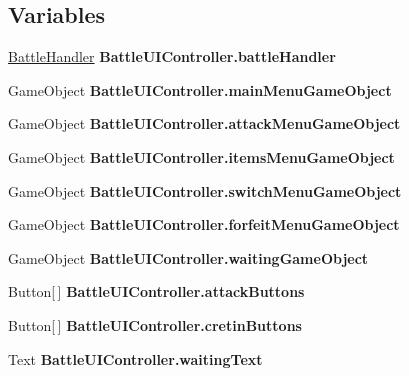 \subsection*{Variables}
\begin{DoxyCompactItemize}
\item 
\hypertarget{group__client_ga1b3ecd57ac7d9161ea56b8942003a2b5}{\hyperlink{class_battle_handler}{Battle\-Handler} {\bfseries Battle\-U\-I\-Controller.\-battle\-Handler}}\label{group__client_ga1b3ecd57ac7d9161ea56b8942003a2b5}

\item 
\hypertarget{group__client_gab272bc3fa2feae7a46ee866a5252d47b}{Game\-Object {\bfseries Battle\-U\-I\-Controller.\-main\-Menu\-Game\-Object}}\label{group__client_gab272bc3fa2feae7a46ee866a5252d47b}

\item 
\hypertarget{group__client_ga0c493074ee8edeaaeafd6be0792f1b8e}{Game\-Object {\bfseries Battle\-U\-I\-Controller.\-attack\-Menu\-Game\-Object}}\label{group__client_ga0c493074ee8edeaaeafd6be0792f1b8e}

\item 
\hypertarget{group__client_gaf99e8408c55ed31be12051692750cb97}{Game\-Object {\bfseries Battle\-U\-I\-Controller.\-items\-Menu\-Game\-Object}}\label{group__client_gaf99e8408c55ed31be12051692750cb97}

\item 
\hypertarget{group__client_ga980ceadc6a8df5e2993b6fc97dc89083}{Game\-Object {\bfseries Battle\-U\-I\-Controller.\-switch\-Menu\-Game\-Object}}\label{group__client_ga980ceadc6a8df5e2993b6fc97dc89083}

\item 
\hypertarget{group__client_gaf29f6bee62095208f55a9d3fee5a628c}{Game\-Object {\bfseries Battle\-U\-I\-Controller.\-forfeit\-Menu\-Game\-Object}}\label{group__client_gaf29f6bee62095208f55a9d3fee5a628c}

\item 
\hypertarget{group__client_gad6f40ffcec5911934218836218995e41}{Game\-Object {\bfseries Battle\-U\-I\-Controller.\-waiting\-Game\-Object}}\label{group__client_gad6f40ffcec5911934218836218995e41}

\item 
\hypertarget{group__client_ga57dc6e1b53d2412dd00eb29859bac337}{Button\mbox{[}$\,$\mbox{]} {\bfseries Battle\-U\-I\-Controller.\-attack\-Buttons}}\label{group__client_ga57dc6e1b53d2412dd00eb29859bac337}

\item 
\hypertarget{group__client_ga188d6c1d20ceab7503469b77818cb7fc}{Button\mbox{[}$\,$\mbox{]} {\bfseries Battle\-U\-I\-Controller.\-cretin\-Buttons}}\label{group__client_ga188d6c1d20ceab7503469b77818cb7fc}

\item 
\hypertarget{group__client_ga2f5cb0c646d3675c7c7805381d7e54d2}{Text {\bfseries Battle\-U\-I\-Controller.\-waiting\-Text}}\label{group__client_ga2f5cb0c646d3675c7c7805381d7e54d2}

\end{DoxyCompactItemize}
